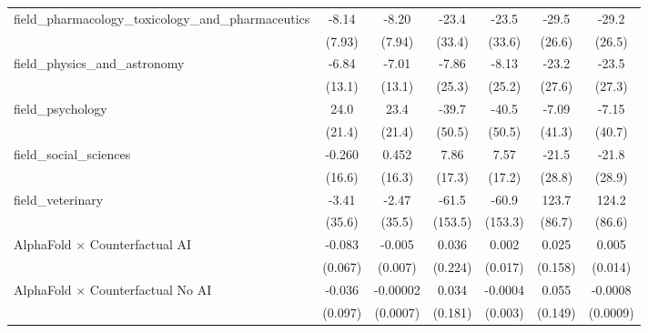 \begin{tabular}{lcccccc}
   field\_pharmacology\_toxicology\_and\_pharmaceutics         & -8.14         & -8.20         & -23.4         & -23.5         & -29.5          & -29.2\\   
                                                               & (7.93)        & (7.94)        & (33.4)        & (33.6)        & (26.6)         & (26.5)\\   
   field\_physics\_and\_astronomy                              & -6.84         & -7.01         & -7.86         & -8.13         & -23.2          & -23.5\\   
                                                               & (13.1)        & (13.1)        & (25.3)        & (25.2)        & (27.6)         & (27.3)\\   
   field\_psychology                                           & 24.0          & 23.4          & -39.7         & -40.5         & -7.09          & -7.15\\   
                                                               & (21.4)        & (21.4)        & (50.5)        & (50.5)        & (41.3)         & (40.7)\\   
   field\_social\_sciences                                     & -0.260        & 0.452         & 7.86          & 7.57          & -21.5          & -21.8\\   
                                                               & (16.6)        & (16.3)        & (17.3)        & (17.2)        & (28.8)         & (28.9)\\   
   field\_veterinary                                           & -3.41         & -2.47         & -61.5         & -60.9         & 123.7          & 124.2\\   
                                                               & (35.6)        & (35.5)        & (153.5)       & (153.3)       & (86.7)         & (86.6)\\   
   AlphaFold $\times$ Counterfactual AI                        & -0.083        & -0.005        & 0.036         & 0.002         & 0.025          & 0.005\\   
                                                               & (0.067)       & (0.007)       & (0.224)       & (0.017)       & (0.158)        & (0.014)\\   
   AlphaFold $\times$ Counterfactual No AI                     & -0.036        & -0.00002      & 0.034         & -0.0004       & 0.055          & -0.0008\\   
                                                               & (0.097)       & (0.0007)      & (0.181)       & (0.003)       & (0.149)        & (0.0009)\\   

\end{tabular}
